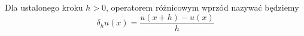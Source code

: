 \documentclass[12pt,a4paper]{report}
\begin{document}


\begin{definition}\label{operator_wporzd}
Dla ustalonego kroku $h>0 $, operatorem różnicowym wprzód nazywać będziemy 
$$
\delta_h u(x) = \frac{u(x+h) - u(x)}{h}
$$
\end{definition}
\end{document}
